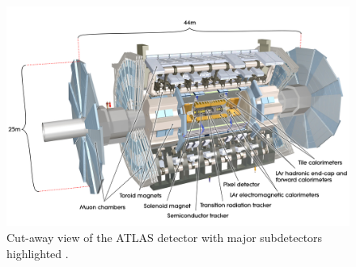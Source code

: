 	\begin{figure}[!ht]
	\centering
	\includegraphics[width=.75\textwidth,keepaspectratio=true]{chapters/chapter3_experiment/images/ATLAS_3d_run2.jpg}
	\caption{ Cut-away view of the \gls{ATLAS} detector with major subdetectors highlighted \cite{atlas-schematics}.}
	\label{fig:ATLAS}
	\end{figure}




